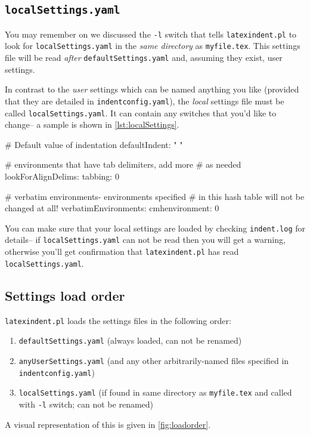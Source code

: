 \subsection{\lstinline!localSettings.yaml!}
You may remember on  we discussed the \lstinline!-l! switch
that tells \lstinline!latexindent.pl! to look for \lstinline!localSettings.yaml! in the 
\emph{same directory} as \lstinline!myfile.tex!. This settings file will 
be read \emph{after} \lstinline!defaultSettings.yaml! and, assuming they exist, 
user settings. 
 	 	 	 	 	
In contrast to the \emph{user} settings which can be named anything you like (provided that
they are detailed in \lstinline!indentconfig.yaml!), the \emph{local} settings file
must be called \lstinline!localSettings.yaml!. It can contain any switches that you'd
like to change-- a sample is shown in \cref{lst:localSettings}.
 	 	 	 	 	
\begin{yaml}[caption={\lstinline!localSettings.yaml! (example)},label={lst:localSettings}]
# Default value of indentation
defaultIndent: " "

# environments that have tab delimiters, add more 
# as needed
lookForAlignDelims:
   tabbing: 0

#  verbatim environments- environments specified 
#  in this hash table will not be changed at all!
verbatimEnvironments:
    cmhenvironment: 0
\end{yaml}
 	 	 	 	 	
You can make sure that your local settings are loaded by checking \lstinline!indent.log!
for details-- if \lstinline!localSettings.yaml! can not be read then you will
get a warning, otherwise you'll get confirmation that 
\lstinline!latexindent.pl! has read \lstinline!localSettings.yaml!.
 	 	 	 	 	
\subsection{Settings load order}\label{sec:loadorder}
\lstinline!latexindent.pl! loads the settings files in the following order:
\begin{enumerate}
	\item \lstinline!defaultSettings.yaml! (always loaded, can not be renamed)
	\item \lstinline!anyUserSettings.yaml! (and any other arbitrarily-named files specified in \lstinline!indentconfig.yaml!)
	\item \lstinline!localSettings.yaml! (if found in same directory as \lstinline!myfile.tex! and called
	with \lstinline!-l! switch; can not be renamed)
\end{enumerate}
A visual representation of this is given in \cref{fig:loadorder}.

